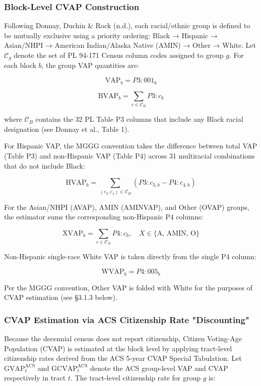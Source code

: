 \documentclass[sn-vancouver,Numbered]{sn-jnl}
\theoremstyle{thmstyleone}%
\theoremstyle{thmstyletwo}%
\theoremstyle{thmstylethree}%
\begin{document}
\subsubsection{Block-Level CVAP Construction}
Following Donnay, Duchin & Rock (n.d.), each racial/ethnic group is defined to be mutually exclusive using a priority ordering: Black → Hispanic → Asian/NHPI → American Indian/Alaska Native (AMIN) → Other → White. Let $\mathcal{C}_g$ denote the set of PL 94-171 Census column codes assigned to group $g$. For each block $b$, the group VAP quantities are:

\begin{equation}
\text{VAP}_b = P3{:}001_b
\label{eq:vap_b}
\end{equation}

\begin{equation}
\text{BVAP}_b = \sum_{c \in \mathcal{C}_B} P3{:}c_b
\label{eq:bvap_b}
\end{equation}


where $\mathcal{C}_B$ contains the 32 PL Table P3 columns that include any Black racial designation (see Donnay et al., Table 1).

For Hispanic VAP, the MGGG convention takes the difference between total VAP (Table P3) and non-Hispanic VAP (Table P4) across 31 multiracial combinations that do not include Black:

\begin{equation}
\text{HVAP}_b = \sum_{(c_3, c_4) \in \mathcal{C}_H} \left( P3{:}c_{3,b} - P4{:}c_{4,b} \right)
\label{eq:hvap_b}
\end{equation}

For the Asian/NHPI (AVAP), AMIN (AMINVAP), and Other (OVAP) groups, the estimator sums the corresponding non-Hispanic P4 columns:

\begin{equation}
\text{XVAP}_b = \sum_{c \in \mathcal{C}_X} P4{:}c_b, \quad X \in \{\text{A, AMIN, O}\}
\label{eq:xvap_b}
\end{equation}


Non-Hispanic single-race White VAP is taken directly from the single P4 column:

\begin{equation}
\text{WVAP}_b = P4{:}005_b
\label{eq:wvap_b}
\end{equation}

Per the MGGG convention, Other VAP is folded with White for the purposes of CVAP estimation (see §3.1.3 below).

\subsubsection{CVAP Estimation via ACS Citizenship Rate "Discounting"}
Because the decennial census does not report citizenship, Citizen Voting-Age Population (CVAP) is estimated at the block level by applying tract-level citizenship rates derived from the ACS 5-year CVAP Special Tabulation. Let $\text{GVAP}^\text{ACS}_{t}$ and $\text{GCVAP}^\text{ACS}_{t}$ denote the ACS group-level VAP and CVAP respectively in tract $t$. The tract-level citizenship rate for group $g$ is:
\end{document}

